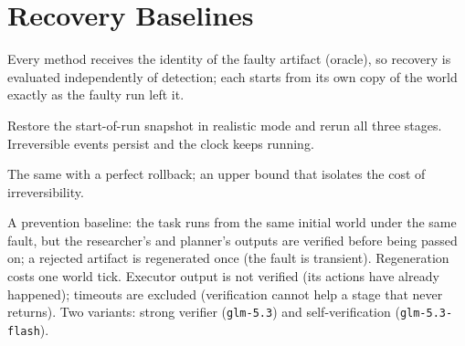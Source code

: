 \documentclass[11pt]{article}
\newcommand{\code}[1]{\texttt{\small #1}}
\begin{document}
\section{Recovery Baselines}
\label{sec:baselines}
Every method receives the identity of the faulty artifact (oracle), so
recovery is evaluated independently of detection; each starts from its own
copy of the world exactly as the faulty run left it.
\begin{description}[leftmargin=1em,itemsep=2pt]
  \item[Full restart (realistic).] Restore the start-of-run snapshot in
        realistic mode and rerun all three stages. Irreversible events persist
        and the clock keeps running.
  \item[Full restart (oracle).] The same with a perfect rollback; an upper
        bound that isolates the cost of irreversibility.
  \item[Always-verify.] A prevention baseline: the task runs from the same
        initial world under the same fault, but the researcher's and planner's
        outputs are verified before being passed on; a rejected artifact is
        regenerated once (the fault is transient). Regeneration costs one world
        tick. Executor output is not verified (its actions have already
        happened); timeouts are excluded (verification cannot help a stage
        that never returns). Two variants: strong verifier (\code{glm-5.3})
        and self-verification (\code{glm-5.3-flash}).
\end{description}

\end{document}
